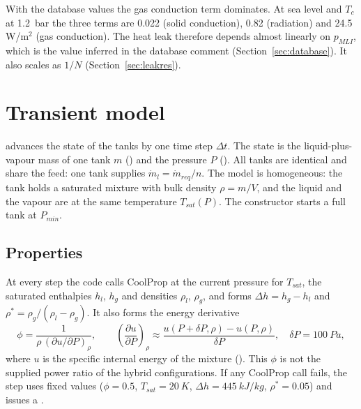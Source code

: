 \documentclass[a4paper,11pt]{article}
\newcommand{\mdot}{\dot m}
\begin{document}
With the database values the gas conduction term dominates. At sea level and $T_c$ at
\SI{1.2}{bar} the three terms are 0.022 (solid conduction), 0.82 (radiation) and 24.5\,W/m$^2$ (gas conduction). The heat leak therefore depends almost
linearly on $p_{MLI}$, which is the value inferred in the database comment
(Section~\ref{sec:database}). It also scales as $1/N$ (Section~\ref{sec:leakres}).

\section{Transient model}\label{sec:transient}

 advances the state of the tanks by one time step
$\Delta t$. The state is the liquid-plus-vapour mass of one tank $m$ () and the
pressure $P$ (). All tanks are identical and share the feed: one tank supplies
$\mdot_l = \mdot_{req}/n$. The model is homogeneous: the tank holds a saturated mixture with
bulk density $\rho = m/V$, and the liquid and the vapour are at the same temperature
$T_{sat}(P)$. The constructor starts a full tank at $P_{min}$.

\subsection{Properties}
At every step the code calls CoolProp at the current pressure for $T_{sat}$, the saturated
enthalpies $h_l$, $h_g$ and densities $\rho_l$, $\rho_g$, and forms $\Delta h = h_g - h_l$ and
$\rho^* = \rho_g/(\rho_l - \rho_g)$. It also forms the energy derivative
\begin{equation}
  \phi = \frac{1}{\rho\,(\partial u/\partial P)_\rho},
  \qquad
  \left(\frac{\partial u}{\partial P}\right)_\rho \approx
  \frac{u(P + \delta P, \rho) - u(P, \rho)}{\delta P},\quad \delta P = \SI{100}{Pa},
  \label{eq:phi}
\end{equation}
where $u$ is the specific internal energy of the mixture (). This
$\phi$ is not the supplied power ratio of the hybrid configurations. If any CoolProp call fails,
the step uses fixed values ($\phi = 0.5$, $T_{sat} = \SI{20}{K}$,
$\Delta h = \SI{445}{kJ/kg}$, $\rho^* = 0.05$) and issues a .
\end{document}
